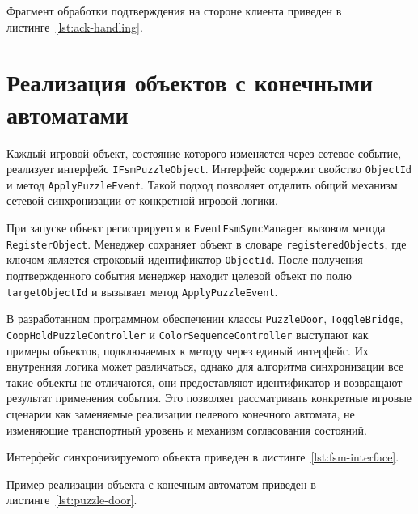 Фрагмент обработки подтверждения на стороне клиента приведен в листинге~\ref{lst:ack-handling}.


\section{Реализация объектов с конечными автоматами}

Каждый игровой объект, состояние которого изменяется через сетевое событие, реализует интерфейс \texttt{IFsmPuzzleObject}. Интерфейс содержит свойство \texttt{ObjectId} и метод \texttt{ApplyPuzzleEvent}. Такой подход позволяет отделить общий механизм сетевой синхронизации от конкретной игровой логики.

При запуске объект регистрируется в \texttt{EventFsmSyncManager} вызовом метода \texttt{RegisterObject}. Менеджер сохраняет объект в словаре \texttt{registeredObjects}, где ключом является строковый идентификатор \texttt{ObjectId}. После получения подтвержденного события менеджер находит целевой объект по полю \texttt{targetObjectId} и вызывает метод \texttt{ApplyPuzzleEvent}.

В разработанном программном обеспечении классы \texttt{PuzzleDoor}, \texttt{ToggleBridge}, \texttt{CoopHoldPuzzleController} и \texttt{ColorSequenceController} выступают как примеры объектов, 
подключаемых к методу через единый интерфейс. Их внутренняя логика может различаться, однако для алгоритма синхронизации все такие объекты не отличаются,
они предоставляют идентификатор и возвращают результат применения события. Это позволяет рассматривать конкретные игровые сценарии как заменяемые реализации целевого конечного автомата, 
не изменяющие транспортный уровень и механизм согласования состояний.

Интерфейс синхронизируемого объекта приведен в листинге~\ref{lst:fsm-interface}.


Пример реализации объекта с конечным автоматом приведен в листинге~\ref{lst:puzzle-door}.



